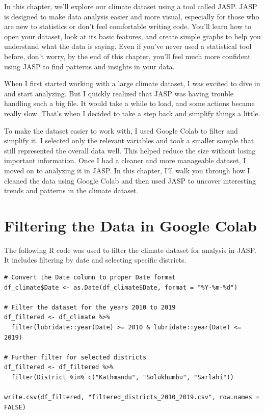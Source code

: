 In this chapter, we’ll explore our climate dataset using a tool called JASP. JASP is designed to make data analysis easier and more visual, especially for those who are new to statistics or don’t feel comfortable writing code. You’ll learn how to open your dataset, look at its basic features, and create simple graphs to help you understand what the data is saying.  Even if you’ve never used a statistical tool before, don’t worry, by the end of this chapter, you’ll feel much more confident using JASP to find patterns and insights in your data.

When I first started working with a large climate dataset, I was excited to dive in and start analyzing. But I quickly realized that JASP was having trouble handling such a big file. It would take a while to load, and some actions became really slow. That’s when I decided to take a step back and simplify things a little.

To make the dataset easier to work with, I used Google Colab to filter and simplify it. I selected only the relevant variables and took a smaller sample that still represented the overall data well. This helped reduce the size without losing important information. Once I had a cleaner and more manageable dataset, I moved on to analyzing it in JASP. In this chapter, I’ll walk you through how I cleaned the data using Google Colab and then used JASP to uncover interesting trends and patterns in the climate dataset.

\section*{Filtering the Data in Google Colab}

The following R code was used to filter the climate dataset for analysis in JASP. It includes filtering by date and selecting specific districts.

\begin{verbatim}
# Convert the Date column to proper Date format
df_climate$Date <- as.Date(df_climate$Date, format = "%Y-%m-%d")

# Filter the dataset for the years 2010 to 2019
df_filtered <- df_climate %>%
  filter(lubridate::year(Date) >= 2010 & lubridate::year(Date) <= 2019)

# Further filter for selected districts
df_filtered <- df_filtered %>%
  filter(District %in% c("Kathmandu", "Solukhumbu", "Sarlahi"))

write.csv(df_filtered, "filtered_districts_2010_2019.csv", row.names = FALSE)
\end{verbatim}

